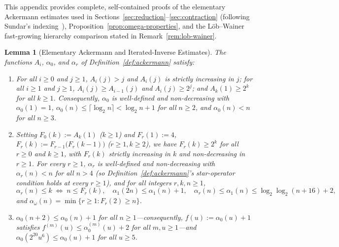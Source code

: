 \documentclass[11pt]{article}
\newtheorem{lemma}[theorem]{Lemma}
\theoremstyle{definition}
\theoremstyle{remark}
\begin{document}
This appendix provides complete, self-contained proofs of the elementary Ackermann estimates used in Sections~\ref{sec:reduction}--\ref{sec:contraction} (following Sundar's indexing~\cite[Section~1.2]{Sundar1992}), Proposition~\ref{prop:omega-properties}, and the L\"{o}b--Wainer fast-growing hierarchy comparison stated in Remark~\ref{rem:lob-wainer}.

\begin{lemma}[Elementary Ackermann and Iterated-Inverse Estimates]
\label{lem:ack-basic}
The functions $A_i$, $\alpha_0$, and $\alpha_r$ of Definition~\ref{def:ackermann} satisfy:
\begin{enumerate}[label=(\arabic*)]
  \item For all $i \ge 0$ and $j \ge 1$, $A_i(j) > j$ and $A_i(j)$ is strictly increasing in $j$; for all $i \ge 1$ and $j \ge 1$, $A_i(j) \ge A_{i-1}(j)$ and $A_i(j) \ge 2^j$; and $A_k(1) \ge 2^k$ for all $k \ge 1$. Consequently, $\alpha_0$ is well-defined and non-decreasing with $\alpha_0(1) = 1$, $\alpha_0(n) \le \lceil \log_2 n \rceil < \log_2 n + 1$ for all $n \ge 2$, and $\alpha_0(n) < n$ for all $n \ge 3$.
  \item Setting $F_0(k) := A_k(1)$ ($k \ge 1$) and $F_r(1) := 4$, $F_r(k) := F_{r-1}\big(F_r(k - 1)\big)$ ($r \ge 1, k \ge 2$), we have $F_r(k) \ge 2^k$ for all $r \ge 0$ and $k \ge 1$, with $F_r(k)$ strictly increasing in $k$ and non-decreasing in $r \ge 1$. For every $r \ge 1$, $\alpha_r$ is well-defined and non-decreasing with $\alpha_r(n) < n$ for all $n > 4$ (so Definition~\ref{def:ackermann}'s star-operator condition holds at every $r \ge 1$), and for all integers $r, k, n \ge 1$,
  \[
  \alpha_r(n) \le k \;\Longleftrightarrow\; n \le F_r(k),
  \quad
  \alpha_1(2n) \le \alpha_1(n) + 1,
  \quad
  \alpha_r(n) \le \alpha_1(n) \le \log_2\log_2(n + 16) + 2,
  \]
  and $\alpha_\omega(n) = \min\{r \ge 1 : F_r(2) \ge n\}$.
  \item $\alpha_0(n + 2) \le \alpha_0(n) + 1$ for all $n \ge 1$---consequently, $f(u) := \alpha_0(u) + 1$ satisfies $f^{(m)}(u) \le \alpha_0^{(m)}(u) + 2$ for all $m, u \ge 1$---and $\alpha_0(2^{20} u^6) \le \alpha_0(u) + 1$ for all $u \ge 5$.
\end{enumerate}
\end{lemma}
\end{document}
